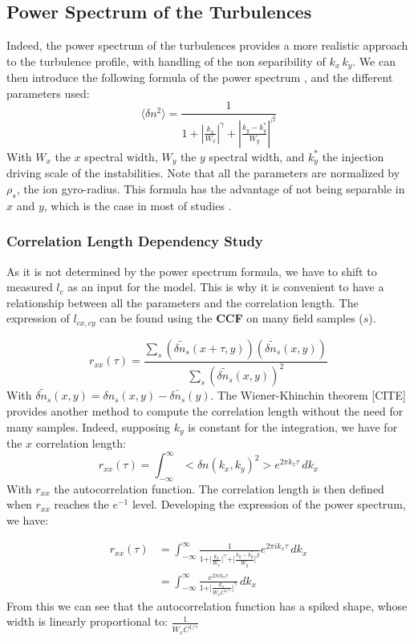 \documentclass[11pt,openany]{report}
\begin{document}
\begin{multicols}{2}
    \subsection{Power Spectrum of the Turbulences}

    Indeed, the power spectrum of the turbulences provides a more realistic approach to the turbulence profile, with handling of the non separibility of $k_x \, k_y$. We can then introduce the following formula of the power spectrum \cite{Unseparable_Turbulence_Spectra}, and the different parameters used:
    $$
        \langle\delta n^2 \rangle = \frac{1}{1 + \left| \frac{k_x}{W_x} \right|^\gamma + \left| \frac{k_y - k_y^*}{W_y} \right|^\beta}
    $$
    With $W_x$ the $x$ spectral width, $W_y$ the $y$ spectral width, and $k_y^*$ the injection driving scale of the instabilities. Note that all the parameters are normalized by $\rho_s$, the ion gyro-radius. This formula has the advantage of not being separable in $x$ and $y$, which is the case in most of studies \cite{Power_spectrum_coupled}.

    \subsubsection{Correlation Length Dependency Study}

    As it is not determined by the power spectrum formula, we have to shift to measured $l_c$ as an input for the model. This is why it is convenient to have a relationship between all the parameters and the correlation length. The expression of $l_{cx,cy}$ can be found using the \textbf{CCF} on many field samples ($s$).

    $$
        r_{xx}(\tau) = \frac{\sum_{s}\left(\tilde{\delta n_s}(x + \tau, y)\right)\left(\tilde{\delta n_s}(x, y)\right)}{\sum_{s}\left(\tilde{\delta n_s}(x, y)\right)^2}
    $$
    With $\tilde{\delta n_s}(x,y) = \delta n_s(x,y) - \bar{\delta n_s}(y)$. The Wiener-Khinchin theorem [CITE] provides another method to compute the correlation length without the need for many samples. Indeed, supposing $k_y$ is constant for the integration, we have for the $x$ correlation length:
    $$
        r_{xx}(\tau) = \int_{-\infty}^{\infty} <\delta n(k_x, k_y)^2> e^{2 \pi k_x \tau} \, dk_x
    $$
    With $r_{xx}$ the autocorrelation function. The correlation length is then defined when $r_{xx}$ reaches the $e^{-1}$ level. Developing the expression of the power spectrum, we have:

    \begin{align}
        r_{x x}(\tau) & = \int_{-\infty}^{\infty} \frac{1}{1 + \vert \frac{k_x}{W_x} \vert^\gamma + \vert \frac{k_y - k_y^*}{W_y}\vert^\beta} e^{2 \pi i k_x \tau} \, dk_x \\
                      & = \int_{-\infty}^{\infty} \frac{e^{2 \pi i k_x \tau}}{1 + \vert \frac{k_x}{W_x C^{1/ \gamma}} \vert^\gamma} \, dk_x
    \end{align}
    From this we can see that the autocorrelation function has a spiked shape, whose width is linearly proportional to:
    $\frac{1}{W_x C^{1/ \gamma}}$


\end{multicols}
\end{document}
